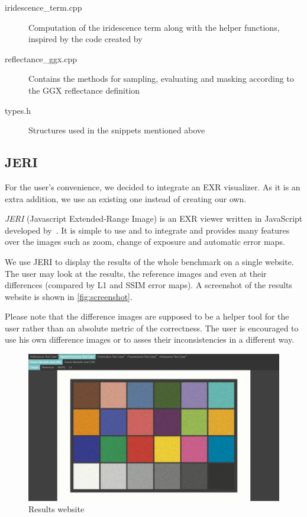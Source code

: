 \begin{description}
	\item[iridescence\_term.cpp] Computation of the iridescence term along with the helper functions, inspired by the code created by \citet{belcour2017practical}
	\item[reflectance\_ggx.cpp] Contains the methods for sampling, evaluating and masking according to the GGX reflectance definition~\cite{walter2007microfacet}
	\item[types.h] Structures used in the snippets mentioned above 
\end{description}

\subsection{JERI}

For the user's convenience, we decided to integrate an EXR visualizer. As it is an extra addition, we use an existing one instead of creating our own.

\emph{JERI} (Javascript Extended-Range Image) is an EXR viewer written in JavaScript developed by~\citet{jeriWeb}. It is simple to use and to integrate and provides many features over the images such as zoom, change of exposure and automatic error maps.

We use JERI to display the results of the whole benchmark on a single website. The user may look at the results, the reference images and even at their differences (compared by L1 and SSIM error maps). A screenshot of the results website is shown in \autoref{fig:screenshot}.

Please note that the difference images are supposed to be a helper tool for the user rather than an absolute metric of the correctness. The user is encouraged to use his own difference images or to asses their inconsistencies in a different way.

\begin{figure}
	\centering
	\includegraphics[width=\linewidth]{img/screenshot.png}
	\caption{Results website}
	\label{fig:screenshot}
\end{figure}

